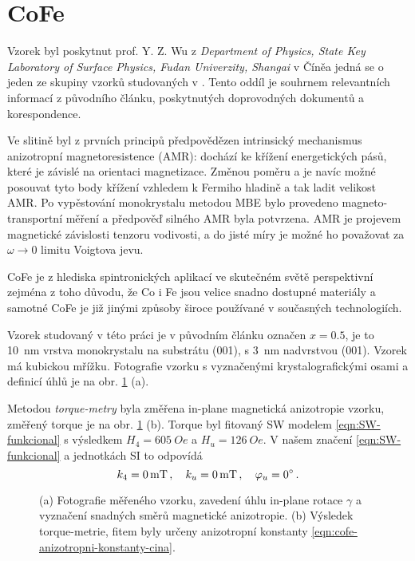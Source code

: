 \section{CoFe}
\label{chap:vzorek-cofe}

Vzorek byl poskytnut prof. Y. Z. Wu z \emph{Department of Physics, State Key Laboratory of Surface Physics, Fudan Univerzity, Shangai} v Číněa jedná se o jeden ze skupiny vzorků studovaných v \cite{zengIntrinsicMechanismAnisotropic2020}.
Tento oddíl je souhrnem relevantních informací z původního článku, poskytnutých doprovodných dokumentů a korespondence.

Ve slitině  byl z prvních principů předpovědězen intrinsický mechanismus anizotropní magnetoresistence (AMR): dochází ke křížení energetických pásů, které je závislé na orientaci magnetizace.
Změnou poměru  a  je navíc možné posouvat tyto body křížení vzhledem k Fermiho hladině a tak ladit velikost AMR.
Po vypěstování monokrystalu metodou MBE bylo provedeno magneto-transportní měření a předpověď silného AMR byla potvrzena.
AMR je projevem magnetické závislosti tenzoru vodivosti, a do jisté míry je možné ho považovat za $\omega\to 0$ limitu Voigtova jevu.

CoFe je z hlediska spintronických aplikací ve skutečném světě perspektivní zejména z toho důvodu, že Co i Fe jsou velice snadno dostupné materiály a samotné CoFe je již jinými způsoby široce používané v současných technologiích.

Vzorek studovaný v této práci je v původním článku označen $x=0.5$, je to \SI{10}{\nano\meter} vrstva monokrystalu  na substrátu (001), s \SI{3}{\nano\meter} nadvrstvou (001).
Vzorek má kubickou mřížku.
Fotografie vzorku s vyznačenými krystalografickými osami a definicí úhlů je na obr. \ref{fig:vzorek-cofe} (a).

Metodou \emph{torque-metry} byla změřena in-plane magnetická anizotropie vzorku, změřený torque je na obr. \ref{fig:vzorek-cofe} (b).
Torque byl fitovaný SW modelem \eqref{eqn:SW-funkcional} s výsledkem $H_4=\SI{605}{Oe}$ a $H_u=\SI{126}{Oe}$.
V našem značení \eqref{eqn:SW-funkcional} a jednotkách SI to odpovídá
\begin{equation}
\label{eqn:cofe-anizotropni-konstanty-cina}
    k_4 = \SI{0}{\milli\tesla} \,,\quad k_u = \SI{0}{mT} \,,\quad \varphi_u = \SI{0}{\degree} \,.
\end{equation}

\begin{figure}[htbp]
    \centering
    \caption{(a) Fotografie měřeného vzorku, zavedení úhlu in-plane rotace $\gamma$ a vyznačení snadných směrů magnetické anizotropie. (b) Výsledek torque-metrie, fitem byly určeny anizotropní konstanty \eqref{eqn:cofe-anizotropni-konstanty-cina}.}
    \label{fig:vzorek-cofe}
\end{figure}
